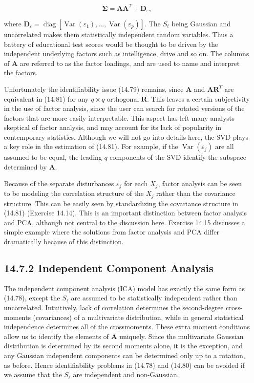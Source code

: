 \documentclass[10pt]{article}
\begin{document}
\begin{equation*}
\boldsymbol{\Sigma}=\mathbf{A} \mathbf{A}^{T}+\mathbf{D}_{\varepsilon}, \tag{14.81}
\end{equation*}


where $\mathbf{D}_{\varepsilon}=\operatorname{diag}\left[\operatorname{Var}\left(\varepsilon_{1}\right), \ldots, \operatorname{Var}\left(\varepsilon_{p}\right)\right]$. The $S_{\ell}$ being Gaussian and uncorrelated makes them statistically independent random variables. Thus a battery of educational test scores would be thought to be driven by the independent underlying factors such as intelligence, drive and so on. The columns of $\mathbf{A}$ are referred to as the factor loadings, and are used to name and interpret the factors.

Unfortunately the identifiability issue (14.79) remains, since $\mathbf{A}$ and $\mathbf{A R}^{T}$ are equivalent in (14.81) for any $q \times q$ orthogonal $\mathbf{R}$. This leaves a certain subjectivity in the use of factor analysis, since the user can search for rotated versions of the factors that are more easily interpretable. This aspect has left many analysts skeptical of factor analysis, and may account for its lack of popularity in contemporary statistics. Although we will not go into details here, the SVD plays a key role in the estimation of (14.81). For example, if the $\operatorname{Var}\left(\varepsilon_{j}\right)$ are all assumed to be equal, the leading $q$ components of the SVD identify the subspace determined by $\mathbf{A}$.

Because of the separate disturbances $\varepsilon_{j}$ for each $X_{j}$, factor analysis can be seen to be modeling the correlation structure of the $X_{j}$ rather than the covariance structure. This can be easily seen by standardizing the covariance structure in (14.81) (Exercise 14.14). This is an important distinction between factor analysis and PCA, although not central to the discussion here. Exercise 14.15 discusses a simple example where the solutions from factor analysis and PCA differ dramatically because of this distinction.

\subsection*{14.7.2 Independent Component Analysis}
The independent component analysis (ICA) model has exactly the same form as (14.78), except the $S_{\ell}$ are assumed to be statistically independent rather than uncorrelated. Intuitively, lack of correlation determines the second-degree cross-moments (covariances) of a multivariate distribution, while in general statistical independence determines all of the crossmoments. These extra moment conditions allow us to identify the elements of $\mathbf{A}$ uniquely. Since the multivariate Gaussian distribution is determined by its second moments alone, it is the exception, and any Gaussian independent components can be determined only up to a rotation, as before. Hence identifiability problems in (14.78) and (14.80) can be avoided if we assume that the $S_{\ell}$ are independent and non-Gaussian.
\end{document}
